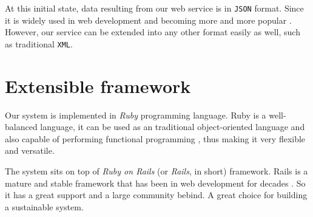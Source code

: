 At this initial state, data resulting from our web service
is in \texttt{JSON} \cite{json} format. Since it is widely used in web development
and becoming more and more popular \cite{rest}. However, our service can be extended
into any other format easily as well, such as traditional \texttt{XML}.

\section{Extensible framework}


Our system is implemented in \emph{Ruby} \cite{ruby} programming language.
Ruby is a well-balanced language, it can be used as an traditional
object-oriented language \cite{rubyoo} and also capable of performing
functional programming \cite[]{rubyfp}, thus making it very flexible and versatile.

The system sits on top of \emph{Ruby on Rails}
(or \emph{Rails}, in short) \cite{rails} framework.
Rails is a mature and stable framework that has been in
web development for decades \cite[]{railsd}. So it has a great support
and a large community bebind. A great choice for building a sustainable
system.
